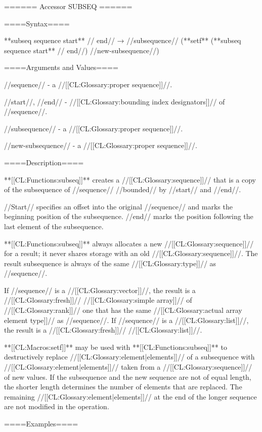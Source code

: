 ====== Accessor SUBSEQ ======

====Syntax====

**subseq {sequence start** //\opt} end// → //subsequence// (**setf** (**subseq {sequence start** //\opt} end//) //new-subsequence//)

====Arguments and Values====

//sequence// - a //[[CL:Glossary:proper sequence]]//.

//start//, //end// - //[[CL:Glossary:bounding index designators]]// of //sequence//. 

//subsequence// - a //[[CL:Glossary:proper sequence]]//.

//new-subsequence// - a //[[CL:Glossary:proper sequence]]//.

====Description====

**[[CL:Functions:subseq]]** creates a //[[CL:Glossary:sequence]]// that is a copy of the subsequence of //sequence// //bounded// by //start// and //end//.

//Start// specifies an offset into the original //sequence// and marks the beginning position of the subsequence. //end// marks the position following the last element of the subsequence.

**[[CL:Functions:subseq]]** always allocates a new //[[CL:Glossary:sequence]]// for a result; it never shares storage with an old //[[CL:Glossary:sequence]]//. The result subsequence is always of the same //[[CL:Glossary:type]]// as //sequence//.

If //sequence// is a //[[CL:Glossary:vector]]//, the result is a //[[CL:Glossary:fresh]]// //[[CL:Glossary:simple array]]// of //[[CL:Glossary:rank]]// one that has the same //[[CL:Glossary:actual array element type]]// as //sequence//. If //sequence// is a //[[CL:Glossary:list]]//, the result is a //[[CL:Glossary:fresh]]// //[[CL:Glossary:list]]//.

**[[CL:Macros:setf]]** may be used with **[[CL:Functions:subseq]]** to destructively replace //[[CL:Glossary:element|elements]]// of a subsequence with //[[CL:Glossary:element|elements]]// taken from a //[[CL:Glossary:sequence]]// of new values. If the subsequence and the new sequence are not of equal length, the shorter length determines the number of elements that are replaced. The remaining //[[CL:Glossary:element|elements]]// at the end of the longer sequence are not modified in the operation.

====Examples====

